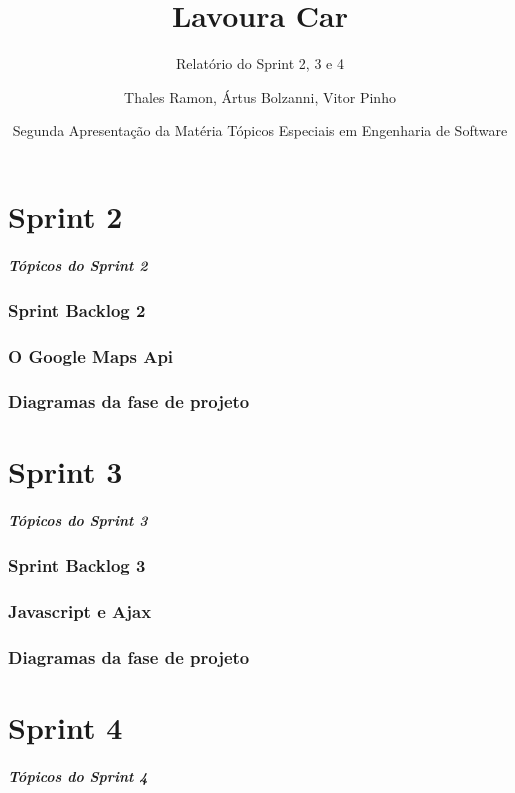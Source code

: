 \documentclass[12pt,a4paper]{beamer}
\author{Thales Ramon, Ártus Bolzanni, Vitor Pinho}
\title{Lavoura Car}
\subtitle{Relatório do Sprint 2, 3 e  4}
\date[UNEB-SI 2010.2]{Segunda Apresentação da Matéria Tópicos Especiais em Engenharia de Software}
\institute[UNEB]{Universidade Estadual da Bahia}
\begin{document}
	\begin{frame}
		\titlepage
	\end{frame}
	

	\part{Sprint 2}
		
		\begin{frame}
			\frametitle{Tópicos do Sprint 2}
			\tableofcontents[pausesections]
		\end{frame}
		
		\section{Sprint Backlog 2}
		\section{O Google Maps Api}
		\section{Diagramas da fase de projeto}
	\part{Sprint 3}
	
		\begin{frame}
			\frametitle{Tópicos do Sprint 3}
			\tableofcontents[pausesections]
		\end{frame}	
	
		\section{Sprint Backlog 3}
		\section{Javascript e Ajax}
		\section{Diagramas da fase de projeto}
	\part{Sprint 4}
	
		\begin{frame}
			\frametitle{Tópicos do Sprint 4}
			\tableofcontents[pausesections]
		\end{frame}	
	
\end{document}
